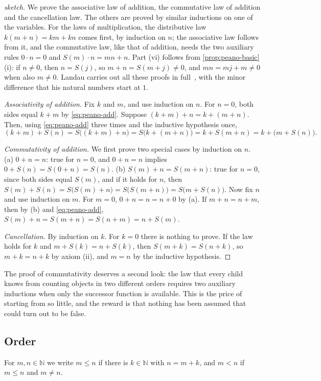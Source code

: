 \begin{proof}[sketch]
We prove the associative law of addition, the commutative law of addition and the cancellation law. The others are proved by similar inductions on one of the variables. For the laws of multiplication, the distributive law $k(m+n)=km+kn$ comes first, by induction on $n$; the associative law follows from it, and the commutative law, like that of addition, needs the two auxiliary rules $0\cdot n=0$ and $S(m)\cdot n=mn+n$. Part (vi) follows from \cref{prop:peano-basic}\,(i): if $n\ne0$, then $n=S(j)$, so $m+n=S(m+j)\ne0$, and $mn=mj+m\ne0$ when also $m\ne0$. Landau carries out all these proofs in full~\cite{landau1930}, with the minor difference that his natural numbers start at $1$.

\emph{Associativity of addition.} Fix $k$ and $m$, and use induction on $n$. For $n=0$, both sides equal $k+m$ by \eqref{eq:peano-add}. Suppose $(k+m)+n=k+(m+n)$. Then, using \eqref{eq:peano-add} three times and the inductive hypothesis once,
\[
(k+m)+S(n)=S\bigl((k+m)+n\bigr)=S\bigl(k+(m+n)\bigr)=k+S(m+n)=k+\bigl(m+S(n)\bigr).
\]

\emph{Commutativity of addition.} We first prove two special cases by induction on $n$. (a) $0+n=n$: true for $n=0$, and $0+n=n$ implies $0+S(n)=S(0+n)=S(n)$. (b) $S(m)+n=S(m+n)$: true for $n=0$, since both sides equal $S(m)$, and if it holds for $n$, then $S(m)+S(n)=S\bigl(S(m)+n\bigr)=S\bigl(S(m+n)\bigr)=S\bigl(m+S(n)\bigr)$. Now fix $n$ and use induction on $m$. For $m=0$, $0+n=n=n+0$ by (a). If $m+n=n+m$, then by (b) and \eqref{eq:peano-add}, $S(m)+n=S(m+n)=S(n+m)=n+S(m)$.

\emph{Cancellation.} By induction on $k$. For $k=0$ there is nothing to prove. If the law holds for $k$ and $m+S(k)=n+S(k)$, then $S(m+k)=S(n+k)$, so $m+k=n+k$ by axiom (ii), and $m=n$ by the inductive hypothesis.
\end{proof}

The proof of commutativity deserves a second look: the law that every child knows from counting objects in two different orders requires two auxiliary inductions when only the successor function is available. This is the price of starting from so little, and the reward is that nothing has been assumed that could turn out to be false.

\subsection{Order}

\begin{definition}
\label{def:n-order}
For $m,n\in\mathbb N$ we write $m\le n$ if there is $k\in\mathbb N$ with $n=m+k$, and $m<n$ if $m\le n$ and $m\ne n$.
\end{definition}

